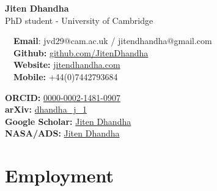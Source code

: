 \documentclass{article}
\begin{document}
\small %

\begin{center}
\huge
\textbf{Jiten Dhandha} \\
\normalsize
PhD student - University of Cambridge \\
\end{center}

\begin{minipage}[ht]{0.6\linewidth}
	\faEnvelope~~\textbf{Email}: jvd29@cam.ac.uk / jitendhandha@gmail.com\\
	\faGithub~~\textbf{Github:} \href{https://github.com/JitenDhandha}{github.com/JitenDhandha}\\
	\faGlobe~~\textbf{Website:} \href{https://jitendhandha.com}{jitendhandha.com} \\
  \faPhone~~\textbf{Mobile:} +44(0)7442793684 \\
\end{minipage}
\begin{minipage}[ht]{0.34\linewidth}
	\begin{flushright}
    \textbf{ORCID:} \href{https://orcid.org/0000-0002-1481-0907}{0000-0002-1481-0907} \\
    \textbf{arXiv:} \href{https://arxiv.org/a/dhandha_j_1.html}{dhandha\_j\_1} \\
    \textbf{Google Scholar:} \href{https://scholar.google.com/citations?user=RjlmcA0AAAAJ}{Jiten Dhandha} \\
    \textbf{NASA/ADS:} \href{https://ui.adsabs.harvard.edu/search/?q=author%3A%22Dhandha%2C+Jiten%22}{Jiten Dhandha} \\
	\end{flushright}
\end{minipage}

\section*{Employment}
\end{document}
